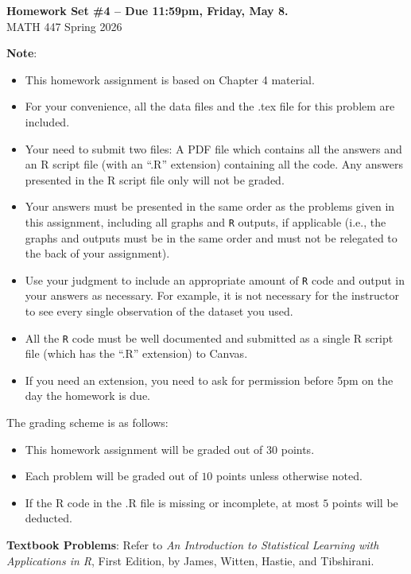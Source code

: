 \documentclass[12pt]{article}
\begin{document}
\newcommand{\bm}[1]{\mbox{\boldmath$#1$}}

\begin{center}{\bf Homework Set \#4 -- Due 11:59pm, Friday, May 8.} \\ {\sc MATH 447 Spring 2026}\end{center}
\textbf{Note}: 
\begin{itemize}
\item This homework assignment is based on Chapter 4 material. 
\item For your convenience, all the data files and the .tex file for this problem are included.
\item Your need to submit two files: A PDF file which contains all the answers and an R script file (with an ``.R'' extension) containing all the code.  Any answers presented in the R script file only will not be graded.
\item Your answers must be presented in the same order as the problems given in this assignment, including all graphs and {\tt R} outputs, if applicable (i.e., the graphs and outputs must be in the same order and must not be relegated to the back of your assignment). 
\item Use your judgment to include an appropriate amount of {\tt R} code and output in your answers as necessary. For example, it is not necessary for the instructor to see every single observation of the dataset you used.
\item All the {\tt R} code must be well documented and submitted as a single R script file (which has the ``.R'' extension) to Canvas. 
\item If you need an extension, you need to ask for permission before 5pm on the day the homework is due.
\end{itemize}

The grading scheme is as follows:
\begin{itemize}
\item This homework assignment will be graded out of $30$ points.
\item Each problem will be graded out of $10$ points unless otherwise noted.
\item If the R code in the .R file is missing or incomplete, at most $5$ points will be deducted.
\end{itemize}

\textbf{Textbook Problems}: Refer to \textit{An Introduction to Statistical Learning with Applications in R}, First Edition, by James, Witten, Hastie, and Tibshirani.
\end{document}
